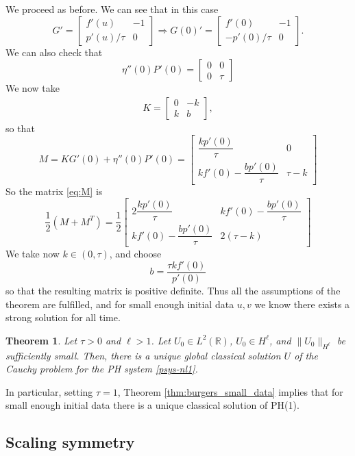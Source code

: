 \documentclass{article}
\theoremstyle{plain}
\newtheorem{theorem}{Theorem}
\theoremstyle{definition}
\numberwithin{theorem}{section}
\begin{document}
We proceed as before. We can see that in this case
$$
G'=\left[\begin{array}{cc}
f'(u)&  -1\\
p'(u)/\tau & 0
\end{array}\right]\Rightarrow G(0)'=\left[\begin{array}{cc}
f'(0)&  -1\\
-p'(0)/\tau & 0
\end{array}\right].
$$
We can also check that 
$$
\eta''(0)P'(0) = \left[\begin{array}{cc}
0&  0\\
0 &  \tau
\end{array}\right]
$$
We now take
\begin{align*}
    K = \begin{bmatrix} 0 & -k \\ k & b \end{bmatrix},
\end{align*}
so that
$$
M=KG'(0) + \eta''(0)P'(0) = 
  \left[\begin{array}{cc}
\dfrac{kp'(0)}{\tau} &  0\\
kf'(0) -\dfrac{bp'(0)}{\tau} &   \tau -k
\end{array}\right] 
$$
So  the matrix \eqref{eq:M} is 
$$
\dfrac{1}{2}(M+M^T) =\dfrac{1}{2}\left[\begin{array}{cc}
2\dfrac{kp'(0)}{\tau} &  kf'(0) -\dfrac{bp'(0)}{\tau} \\
kf'(0) -\dfrac{bp'(0)}{\tau} &   2(\tau -k)
\end{array}\right] 
$$
We take now $k\in (0,\tau)$, and choose
$$
b=  \dfrac{\tau k f'(0)}{p'(0)}
$$
so that the resulting matrix is positive definite.  Thus all the assumptions of the theorem are fulfilled, and for small enough initial data $u, v$ we know there exists
a strong solution for all time.

\begin{theorem}
\label{thm:Psys_small_data}
    Let
    $\tau > 0$ and $\ell > 1$.
    Let $U_0 \in L^2(\mathbb{R})$,
    $U_0 \in H^\ell$, and $\|U_0\|_{H^\ell}$ be sufficiently small.
    Then, there is a unique global classical solution $U$ of the Cauchy problem for the PH system \eqref{psys-nl1}.
\end{theorem}
In particular, setting $\tau=1$, Theorem \ref{thm:burgers_small_data} implies that for small
enough initial data there is a unique classical  solution of PH(1).

\subsection{Scaling symmetry}
\end{document}
